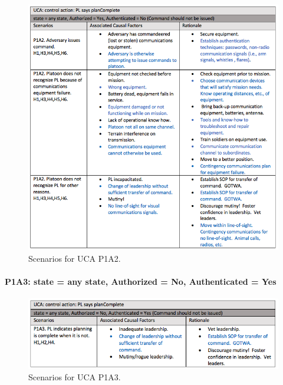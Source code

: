 \documentclass[../../main/main.tex]{subfiles}
\begin{document}
\begin{figure}[ht!]
\begin{center}
\includegraphics[width=\linewidth]{../figures/ucap1a2}
\caption{Scenarios for UCA P1A2.}
\label{ucap1a2}
\end{center}
\end{figure}

\clearpage
\paragraph*{P1A3: state  = any state, Authorized = No, Authenticated = Yes}

\begin{figure}[ht!]
\begin{center}
\includegraphics[width=\linewidth]{../figures/ucap1a3}
\caption{Scenarios for UCA P1A3.}
\label{ucap1a3}
\end{center}
\end{figure}
\end{document}
